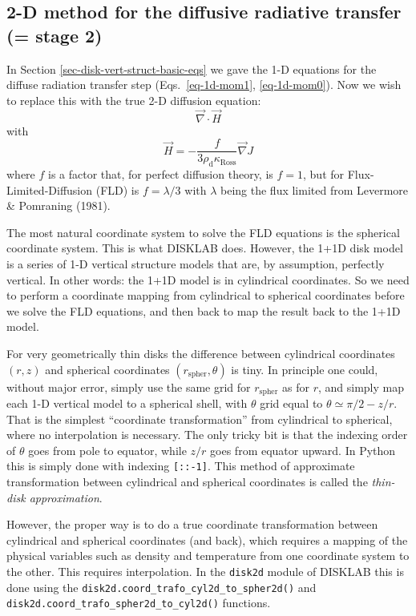\documentclass{book}
\newcommand{\code}[1]{{\small\tt #1}}
\begin{document}
\subsection{2-D method for the diffusive radiative transfer (= stage 2)}
In Section \ref{sec-disk-vert-struct-basic-eqs} we gave the 1-D equations for
the diffuse radiation transfer step (Eqs.~\ref{eq-1d-mom1}, \ref{eq-1d-mom0}).
Now we wish to replace this with the true 2-D diffusion equation:
\begin{equation}
\vec\nabla \cdot \vec H
\end{equation}
with
\begin{equation}
\vec H = -\frac{f}{3\rho_{\mathrm{d}}\kappa_{\mathrm{Ross}}} \vec\nabla J
\end{equation}
where $f$ is a factor that, for perfect diffusion theory, is $f=1$, but for
Flux-Limited-Diffusion (FLD) is $f=\lambda/3$ with $\lambda$ being the
flux limited from Levermore \& Pomraning (1981).

The most natural coordinate system to solve the FLD equations is the spherical
coordinate system. This is what {\sf DISKLAB} does. However, the 1+1D disk model
is a series of 1-D vertical structure models that are, by assumption, perfectly
vertical. In other words: the 1+1D model is in cylindrical coordinates. So we
need to perform a coordinate mapping from cylindrical to spherical coordinates
before we solve the FLD equations, and then back to map the result back to the
1+1D model.

For very geometrically thin disks the difference between cylindrical coordinates
$(r,z)$ and spherical coordinates $(r_{\mathrm{spher}},\theta)$ is tiny. In
principle one could, without major error, simply use the same grid for
$r_{\mathrm{spher}}$ as for $r$, and simply map each 1-D vertical model to a
spherical shell, with $\theta$ grid equal to $\theta\simeq\pi/2-z/r$. That is
the simplest ``coordinate transformation'' from cylindrical to spherical, where
no interpolation is necessary. The only tricky bit is that the indexing order
of $\theta$ goes from pole to equator, while $z/r$ goes from equator upward.
In Python this is simply done with indexing \code{[::-1]}. This method of
approximate transformation between cylindrical and spherical coordinates is
called the {\em thin-disk approximation}.

However, the proper way is to do a true coordinate transformation between
cylindrical and spherical coordinates (and back), which requires a mapping of
the physical variables such as density and temperature from one coordinate
system to the other. This requires interpolation. In the \code{disk2d} module of
{\sf DISKLAB} this is done using the
\code{disk2d.coord\_trafo\_cyl2d\_to\_spher2d()} and
\code{disk2d.coord\_trafo\_spher2d\_to\_cyl2d()} functions.
\end{document}
